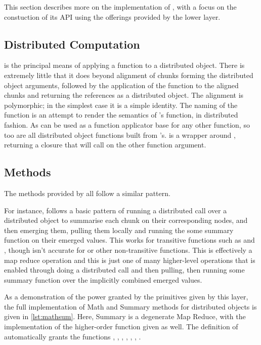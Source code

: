 This section describes more on the implementation of \lso{}, with a focus on the constuction of its API using the offerings provided by the lower layer.

\subsection{Distributed Computation}

 is the principal means of applying a function to a distributed object.
There is extremely little that it does beyond alignment of chunks forming the distributed object arguments, followed by the application of the function to the aligned chunks and returning the references as a distributed object.
The alignment is polymorphic; in the simplest case it is a simple identity.
The naming of the function is an attempt to render the semantics of \R{}'s  function, in distributed fashion.
As  can be used as a function applicator base for any other function, so too are all distributed object functions built from 's.
 is a wrapper around , returning a closure that will call  on the other function argument.

\subsection{Methods}

The methods provided by \lso{} all follow a similar pattern.

For instance,  follows a basic pattern of running a distributed call over a distributed object to summarise each chunk on their corresponding nodes, and then emerging them, pulling them locally and running the some summary function on their  emerged values.
This works for transitive functions such as  and , though isn't accurate for  or other non-transitive functions.
This is effectively a map reduce operation and this is just one of many higher-level operations that is enabled through doing a distributed call and then pulling, then running some summary function over the implicitly combined emerged values.

As a demonstration of the power granted by the primitives given by this layer, the full implementation of Math and Summary methods for distributed objects is given in \cref{lst:mathsum}.
Here, Summary is a degenerate Map Reduce, with the implementation of the higher-order  function given as well. The definition of  automatically grants the functions , , , , , , . 

